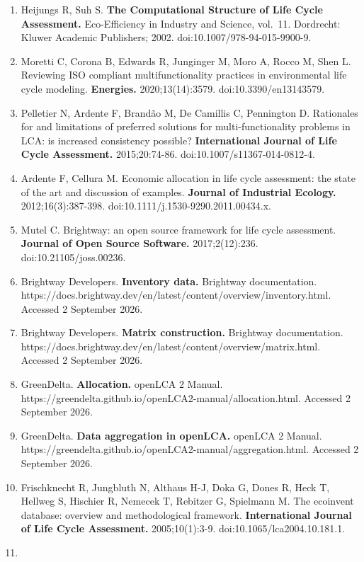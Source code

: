 \documentclass[
  10pt,
  a4paper,
  DIV=11,
  numbers=noendperiod]{scrartcl}
\begin{document}
\begin{enumerate}
\item
  Heijungs R, Suh S. \textbf{The Computational Structure of Life Cycle
  Assessment.} Eco-Efficiency in Industry and Science, vol.~11.
  Dordrecht: Kluwer Academic Publishers; 2002.
  doi:10.1007/978-94-015-9900-9.
\item
  Moretti C, Corona B, Edwards R, Junginger M, Moro A, Rocco M, Shen L.
  Reviewing ISO compliant multifunctionality practices in environmental
  life cycle modeling. \textbf{Energies.} 2020;13(14):3579.
  doi:10.3390/en13143579.
\item
  Pelletier N, Ardente F, Brandão M, De Camillis C, Pennington D.
  Rationales for and limitations of preferred solutions for
  multi-functionality problems in LCA: is increased consistency
  possible? \textbf{International Journal of Life Cycle Assessment.}
  2015;20:74-86. doi:10.1007/s11367-014-0812-4.
\item
  Ardente F, Cellura M. Economic allocation in life cycle assessment:
  the state of the art and discussion of examples. \textbf{Journal of
  Industrial Ecology.} 2012;16(3):387-398.
  doi:10.1111/j.1530-9290.2011.00434.x.
\item
  Mutel C. Brightway: an open source framework for life cycle
  assessment. \textbf{Journal of Open Source Software.} 2017;2(12):236.
  doi:10.21105/joss.00236.
\item
  Brightway Developers. \textbf{Inventory data.} Brightway
  documentation.
  https://docs.brightway.dev/en/latest/content/overview/inventory.html.
  Accessed 2 September 2026.
\item
  Brightway Developers. \textbf{Matrix construction.} Brightway
  documentation.
  https://docs.brightway.dev/en/latest/content/overview/matrix.html.
  Accessed 2 September 2026.
\item
  GreenDelta. \textbf{Allocation.} openLCA 2 Manual.
  https://greendelta.github.io/openLCA2-manual/allocation.html. Accessed
  2 September 2026.
\item
  GreenDelta. \textbf{Data aggregation in openLCA.} openLCA 2 Manual.
  https://greendelta.github.io/openLCA2-manual/aggregation.html.
  Accessed 2 September 2026.
\item
  Frischknecht R, Jungbluth N, Althaus H-J, Doka G, Dones R, Heck T,
  Hellweg S, Hischier R, Nemecek T, Rebitzer G, Spielmann M. The
  ecoinvent database: overview and methodological framework.
  \textbf{International Journal of Life Cycle Assessment.}
  2005;10(1):3-9. doi:10.1065/lca2004.10.181.1.
\item

\end{enumerate}
\end{document}
